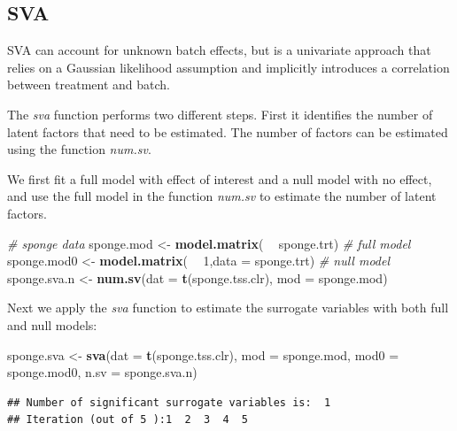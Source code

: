 \documentclass[]{book}
\newenvironment{Shaded}{\begin{snugshade}}{\end{snugshade}}
\newcommand{\KeywordTok}[1]{\textcolor[rgb]{0.13,0.29,0.53}{\textbf{#1}}}
\newcommand{\DataTypeTok}[1]{\textcolor[rgb]{0.13,0.29,0.53}{#1}}
\newcommand{\DecValTok}[1]{\textcolor[rgb]{0.00,0.00,0.81}{#1}}
\newcommand{\StringTok}[1]{\textcolor[rgb]{0.31,0.60,0.02}{#1}}
\newcommand{\CommentTok}[1]{\textcolor[rgb]{0.56,0.35,0.01}{\textit{#1}}}
\newcommand{\OperatorTok}[1]{\textcolor[rgb]{0.81,0.36,0.00}{\textbf{#1}}}
\newcommand{\NormalTok}[1]{#1}
\begin{document}
\subsection{SVA}\label{sva}

SVA can account for unknown batch effects, but is a univariate approach
that relies on a Gaussian likelihood assumption and implicitly
introduces a correlation between treatment and batch.

The \emph{sva} function performs two different steps. First it
identifies the number of latent factors that need to be estimated. The
number of factors can be estimated using the function \emph{num.sv}.

We first fit a full model with effect of interest and a null model with
no effect, and use the full model in the function \emph{num.sv} to
estimate the number of latent factors.

\begin{Shaded}
\begin{Highlighting}[]
\CommentTok{# sponge data}
\NormalTok{sponge.mod <-}\StringTok{ }\KeywordTok{model.matrix}\NormalTok{( }\OperatorTok{~}\StringTok{ }\NormalTok{sponge.trt) }\CommentTok{# full model}
\NormalTok{sponge.mod0 <-}\StringTok{ }\KeywordTok{model.matrix}\NormalTok{( }\OperatorTok{~}\StringTok{ }\DecValTok{1}\NormalTok{,}\DataTypeTok{data =}\NormalTok{ sponge.trt) }\CommentTok{# null model}
\NormalTok{sponge.sva.n <-}\StringTok{ }\KeywordTok{num.sv}\NormalTok{(}\DataTypeTok{dat =} \KeywordTok{t}\NormalTok{(sponge.tss.clr), }\DataTypeTok{mod =}\NormalTok{ sponge.mod)}
\end{Highlighting}
\end{Shaded}

Next we apply the \emph{sva} function to estimate the surrogate
variables with both full and null models:

\begin{Shaded}
\begin{Highlighting}[]
\NormalTok{sponge.sva <-}\StringTok{ }\KeywordTok{sva}\NormalTok{(}\DataTypeTok{dat =} \KeywordTok{t}\NormalTok{(sponge.tss.clr), }\DataTypeTok{mod =}\NormalTok{ sponge.mod, }
                 \DataTypeTok{mod0 =}\NormalTok{ sponge.mod0, }\DataTypeTok{n.sv =}\NormalTok{ sponge.sva.n)}
\end{Highlighting}
\end{Shaded}

\begin{verbatim}
## Number of significant surrogate variables is:  1 
## Iteration (out of 5 ):1  2  3  4  5
\end{verbatim}
\end{document}
